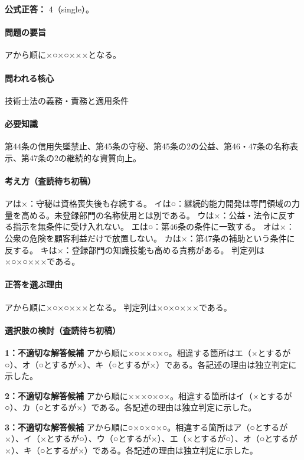 \textbf{公式正答：} 4（single）。

\paragraph{問題の要旨} アから順に×○×○×××となる。

\paragraph{問われる核心} 技術士法の義務・責務と適用条件

\paragraph{必要知識} 第44条の信用失墜禁止、第45条の守秘、第45条の2の公益、第46・47条の名称表示、第47条の2の継続的な資質向上。

\paragraph{考え方（査読待ち初稿）} アは×：守秘は資格喪失後も存続する。 イは○：継続的能力開発は専門領域の力量を高める。未登録部門の名称使用とは別である。 ウは×：公益・法令に反する指示を無条件に受け入れない。 エは○：第46条の条件に一致する。 オは×：公衆の危険を顧客利益だけで放置しない。 カは×：第47条の補助という条件に反する。 キは×：登録部門の知識技能も高める責務がある。 判定列は×○×○×××である。

\paragraph{正答を選ぶ理由} アから順に×○×○×××となる。  判定列は×○×○×××である。

\paragraph{選択肢の検討（査読待ち初稿）}

\noindent\textbf{1：不適切な解答候補} アから順に×○××○×○。相違する箇所はエ（×とするが○）、オ（○とするが×）、キ（○とするが×）である。各記述の理由は独立判定に示した。\par

\noindent\textbf{2：不適切な解答候補} アから順に×××○×○×。相違する箇所はイ（×とするが○）、カ（○とするが×）である。各記述の理由は独立判定に示した。\par

\noindent\textbf{3：不適切な解答候補} アから順に○×○×○×○。相違する箇所はア（○とするが×）、イ（×とするが○）、ウ（○とするが×）、エ（×とするが○）、オ（○とするが×）、キ（○とするが×）である。各記述の理由は独立判定に示した。\par

